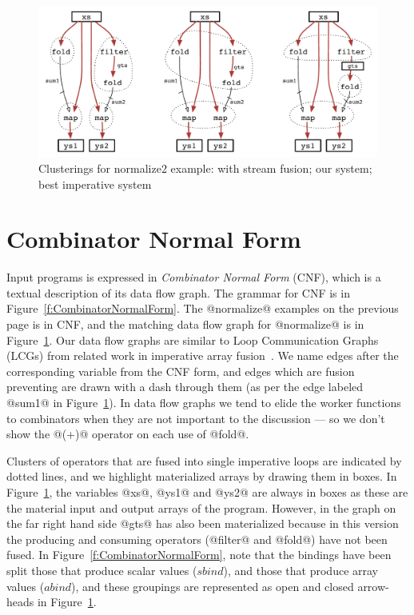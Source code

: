 
\begin{figure}[ht!]
\begin{center}
\includegraphics[scale=0.5]{figures/ex1-compare.pdf}
\end{center}
\caption{Clusterings for normalize2 example: with stream fusion; our system; best imperative system}
\label{f:normalize2-clusterings}
\end{figure}


\section{Combinator Normal Form}
\label{s:CombinatorNormalForm}
Input programs is expressed in \emph{Combinator Normal Form} (CNF), which is a textual description of its data flow graph. The grammar for CNF is in Figure~\ref{f:CombinatorNormalForm}. The @normalize@  examples on the previous page is in CNF, and the matching data flow graph for @normalize@ is in Figure~\ref{f:normalize2-clusterings}. Our data flow graphs are similar to Loop Communication Graphs (LCGs) from related work in imperative array fusion~\cite{gao1993collective}. We name edges after the corresponding variable from the CNF form, and edges which are fusion preventing are drawn with a dash through them (as per the edge labeled @sum1@ in Figure~\ref{f:normalize2-clusterings}). In data flow graphs we tend to elide the worker functions to combinators when they are not important to the discussion --- so we don't show the @(+)@ operator on each use of @fold@.

Clusters of operators that are fused into single imperative loops are indicated by dotted lines, and we highlight materialized arrays by drawing them in boxes. In Figure~\ref{f:normalize2-clusterings}, the variables @xs@, @ys1@ and @ys2@ are always in boxes as these are the material input and output arrays of the program. However, in the graph on the far right hand side @gts@ has also been materialized because in this version the producing and consuming operators (@filter@ and @fold@) have not been fused. In Figure~\ref{f:CombinatorNormalForm}, note that the bindings have been split those that produce scalar values ($sbind$), and those that produce array values ($abind$), and these groupings are represented as open and closed arrow-heads in Figure~\ref{f:normalize2-clusterings}.

